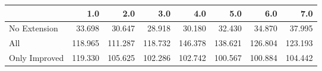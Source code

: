 \begin{tabular}{lrrrrrrr}
\toprule
{} &     1.0 &     2.0 &     3.0 &     4.0 &     5.0 &     6.0 &     7.0 \\
\midrule
No Extension  &  33.698 &  30.647 &  28.918 &  30.180 &  32.430 &  34.870 &  37.995 \\
All           & 118.965 & 111.287 & 118.732 & 146.378 & 138.621 & 126.804 & 123.193 \\
Only Improved & 119.330 & 105.625 & 102.286 & 102.742 & 100.567 & 100.884 & 104.442 \\
\bottomrule
\end{tabular}
